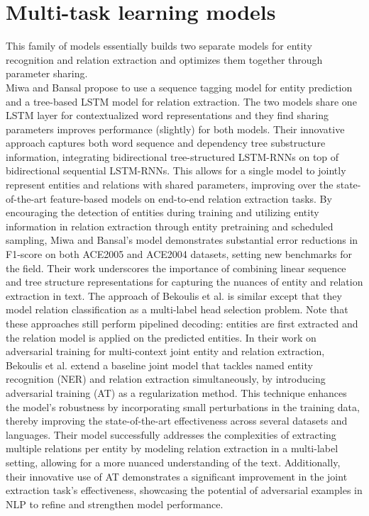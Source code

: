 \section{Multi-task learning models}
This family of models essentially builds two separate models for entity recognition and relation extraction and optimizes them together through parameter sharing.\\
Miwa and Bansal\cite{miwa-bansal-2016-end} propose to use a sequence tagging model for entity prediction and a tree-based LSTM model for relation extraction. The two models share one LSTM layer for contextualized word representations and they find sharing parameters improves performance (slightly) for both models. Their innovative approach captures both word sequence and dependency tree substructure information, integrating bidirectional tree-structured LSTM-RNNs on top of bidirectional sequential LSTM-RNNs. This allows for a single model to jointly represent entities and relations with shared parameters, improving over the state-of-the-art feature-based models on end-to-end relation extraction tasks. By encouraging the detection of entities during training and utilizing entity information in relation extraction through entity pretraining and scheduled sampling, Miwa and Bansal's model demonstrates substantial error reductions in F1-score on both ACE2005 and ACE2004 datasets, setting new benchmarks for the field. Their work underscores the importance of combining linear sequence and tree structure representations for capturing the nuances of entity and relation extraction in text.
The approach of Bekoulis et al.\cite{bekoulis-etal-2018-adversarial} is similar except that they model relation classification as a multi-label head selection problem. Note that these approaches still perform pipelined decoding: entities are first extracted and the relation model is applied on the predicted entities. In their work on adversarial training for multi-context joint entity and relation extraction, Bekoulis et al. extend a baseline joint model that tackles named entity recognition (NER) and relation extraction simultaneously, by introducing adversarial training (AT) as a regularization method. This technique enhances the model's robustness by incorporating small perturbations in the training data, thereby improving the state-of-the-art effectiveness across several datasets and languages. Their model successfully addresses the complexities of extracting multiple relations per entity by modeling relation extraction in a multi-label setting, allowing for a more nuanced understanding of the text. Additionally, their innovative use of AT demonstrates a significant improvement in the joint extraction task's effectiveness, showcasing the potential of adversarial examples in NLP to refine and strengthen model performance.\\
